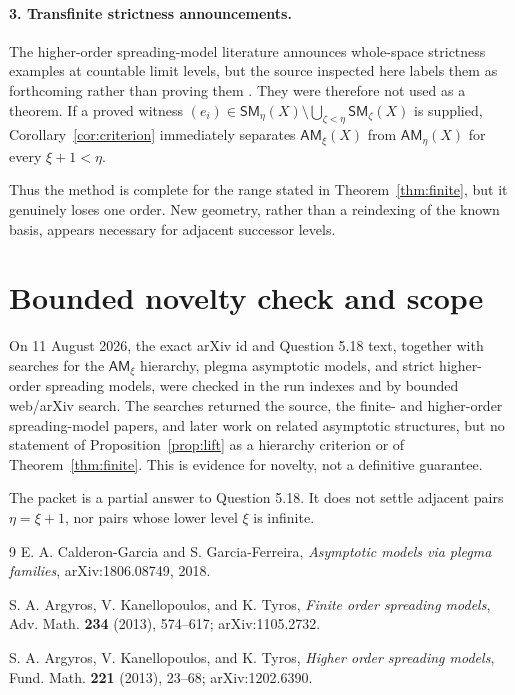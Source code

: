 \documentclass[11pt]{article}
\newcommand{\AM}{\mathsf{AM}}
\newcommand{\SM}{\mathsf{SM}}
\begin{document}
\paragraph{3. Transfinite strictness announcements.}
The higher-order spreading-model literature announces whole-space strictness examples at countable limit levels, but the source inspected here labels them as forthcoming rather than proving them \cite[Remark 3]{Higher}.  They were therefore not used as a theorem.  If a proved witness $(e_i)\in\SM_\eta(X)\setminus\bigcup_{\zeta<\eta}\SM_\zeta(X)$ is supplied, Corollary~\ref{cor:criterion} immediately separates $\AM_\xi(X)$ from $\AM_\eta(X)$ for every $\xi+1<\eta$.

Thus the method is complete for the range stated in Theorem~\ref{thm:finite}, but it genuinely loses one order.  New geometry, rather than a reindexing of the known basis, appears necessary for adjacent successor levels.

\section*{Bounded novelty check and scope}
On 11 August 2026, the exact arXiv id and Question 5.18 text, together with searches for the $\AM_\xi$ hierarchy, plegma asymptotic models, and strict higher-order spreading models, were checked in the run indexes and by bounded web/arXiv search.  The searches returned the source, the finite- and higher-order spreading-model papers, and later work on related asymptotic structures, but no statement of Proposition~\ref{prop:lift} as a hierarchy criterion or of Theorem~\ref{thm:finite}.  This is evidence for novelty, not a definitive guarantee.

The packet is a partial answer to Question 5.18.  It does not settle adjacent pairs $\eta=\xi+1$, nor pairs whose lower level $\xi$ is infinite.

\begin{thebibliography}{9}
E. A. Calderon-Garcia and S. Garcia-Ferreira,
\emph{Asymptotic models via plegma families}, arXiv:1806.08749, 2018.

S. A. Argyros, V. Kanellopoulos, and K. Tyros,
\emph{Finite order spreading models}, Adv. Math. \textbf{234} (2013), 574--617; arXiv:1105.2732.

S. A. Argyros, V. Kanellopoulos, and K. Tyros,
\emph{Higher order spreading models}, Fund. Math. \textbf{221} (2013), 23--68; arXiv:1202.6390.
\end{thebibliography}
\end{document}
